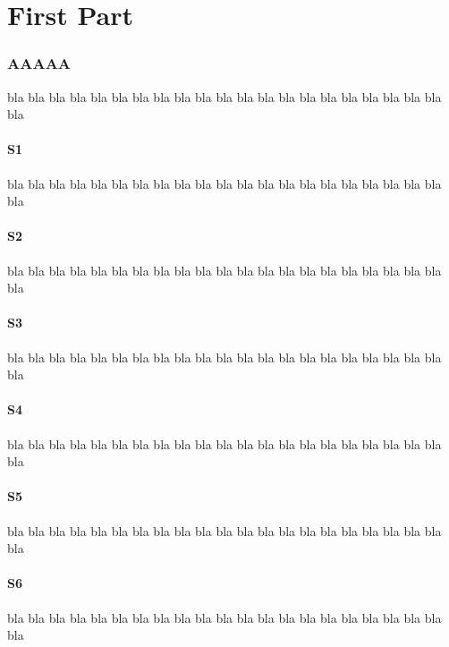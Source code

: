 \documentclass[12pt,a4paper]{article}
\begin{document}
\dosecttoc
\dosectlof[c]                   %
\doparttoc                      %
\dopartlof                      %
\faketableofcontents            %
\fakelistoffigures              %
\part{First Part}
\parttoc
\partlof[r]
\twocolumn                      %
\section{AAAAA}                 %
\secttoc[r]                     %
bla bla bla bla bla bla bla bla bla bla bla
bla bla bla bla bla bla bla bla bla bla bla
\subsection{S1}
bla bla bla bla bla bla bla bla bla bla bla
bla bla bla bla bla bla bla bla bla bla bla
\subsection{S2}
bla bla bla bla bla bla bla bla bla bla bla
bla bla bla bla bla bla bla bla bla bla bla
\subsection{S3}
bla bla bla bla bla bla bla bla bla bla bla
bla bla bla bla bla bla bla bla bla bla bla
\subsection*{S4}
bla bla bla bla bla bla bla bla bla bla bla
bla bla bla bla bla bla bla bla bla bla bla
\subsection{S5}
bla bla bla bla bla bla bla bla bla bla bla
bla bla bla bla bla bla bla bla bla bla bla
\subsection{S6}
bla bla bla bla bla bla bla bla bla bla bla
bla bla bla bla bla bla bla bla bla bla bla
\end{document}
